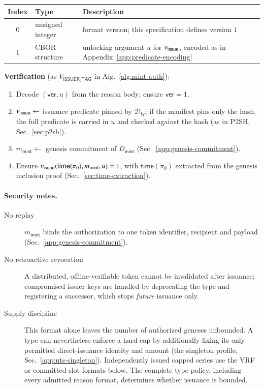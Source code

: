 \begin{longtable}{clp{8.6cm}}
\textbf{Index} & \textbf{Type} & \textbf{Description} \\
\hline
0 & unsigned integer & format version; this specification defines version $1$ \\
1 & CBOR structure & unlocking argument $u$ for $\nu_\mathsf{issue}$, encoded as in Appendix~\ref{app:predicate-encoding} \\
\end{longtable}

\textbf{Verification} (as $V_{\mathsf{ISSUER\_TAG}}$ in Alg.~\ref{alg:mint-auth}):
\begin{enumerate}
	\item Decode $(\mathsf{ver}, u)$ from the reason body; ensure $\mathsf{ver} = 1$.
	\item $\nu_\mathsf{issue} \gets$ issuance predicate pinned by $\mathcal{D}_\mathsf{ty}$; if the manifest pins only the hash, the full predicate is carried in $u$ and checked against the hash (as in P2SH, Sec.~\ref{sec:p2sh}).
	\item $m_\mathsf{mint} \gets$ genesis commitment of $D_\mathsf{mint}$ (Sec.~\ref{app:genesis-commitment}).
	\item Ensure $\nu_\mathsf{issue}(\mathsf{time}(\pi_0), m_\mathsf{mint}, u) = 1$, with $\mathsf{time}(\pi_0)$ extracted from the genesis inclusion proof (Sec.~\ref{sec:time-extraction}).
\end{enumerate}

\paragraph{Security notes.}
\begin{description}
	\item[No replay] $m_\mathsf{mint}$ binds the authorization to one token identifier, recipient and payload (Sec.~\ref{app:genesis-commitment}).
	\item[No retroactive revocation] A distributed, offline-verifiable token cannot be invalidated after issuance; compromised issuer keys are handled by deprecating the type and registering a successor, which stops \emph{future} issuance only.
	\item[Supply discipline] This format alone leaves the number of authorized geneses unbounded. A type can nevertheless enforce a hard cap by additionally fixing its only permitted direct-issuance identity and amount (the singleton profile, Sec.~\ref{app:uts-singleton}). Independently issued capped series use the VRF or committed-slot formats below. The complete type policy, including every admitted reason format, determines whether issuance is bounded.
\end{description}

